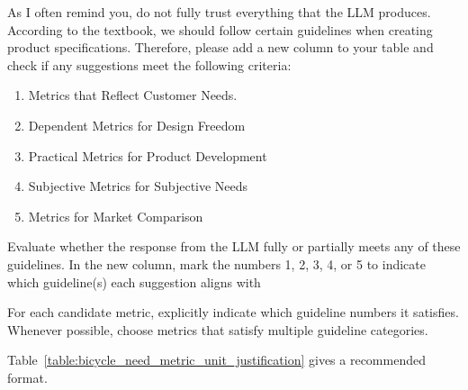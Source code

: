 As I often remind you, do not fully trust everything that the LLM produces. According to the textbook, we should follow certain guidelines when creating product specifications. Therefore, please add a new column to your table and check if any suggestions meet the following criteria:
\FloatBarrier
\begin{enumerate}
    \item Metrics that Reflect Customer Needs.
    \item Dependent Metrics for Design Freedom
    \item Practical Metrics for Product Development
    \item Subjective Metrics for Subjective Needs
    \item Metrics for Market Comparison
\end{enumerate}
\FloatBarrier
Evaluate whether the response from the LLM fully or partially meets any of these guidelines. In the new column, mark the numbers 1, 2, 3, 4, or 5 to indicate which guideline(s) each suggestion aligns with

\begin{tcolorbox}[title=Hint]
For each candidate metric, explicitly indicate which guideline numbers it satisfies. Whenever possible, choose metrics that satisfy multiple guideline categories.
\end{tcolorbox}


Table~\ref{table:bicycle_need_metric_unit_justification} gives a recommended format.


